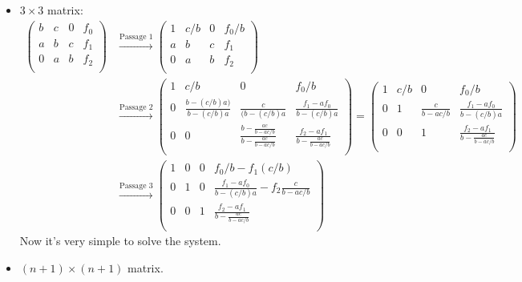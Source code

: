 \documentclass {article}
\begin{document}
\begin{itemize}
	\item $3 \times 3$ matrix:
	\begin{align*}
		\left(
		\begin{array}{ccc|c}
		   b & c &  0 & f_0 \\
		   a & b &  c & f_1 \\
		   0 & a &  b & f_2 \\
		\end{array}	
		\right)
		&\overset{\text{Passage 1}}{\longrightarrow}
		\left(
		\begin{array}{ccc|c}
		   1 & c/b & 0 & f_0/b \\
		   a & b & c & f_1 \\
		   0 & a & b & f_2 \\
		\end{array}
		\right) \\
		&\overset{\text{Passage 2}}{\longrightarrow}
		\left(
		\begin{array}{ccc|c}
		  1 & c/b & 0 & f_0/b \\
		  0 & \frac{b-(c/b)a)}{b-(c/b)a} & \frac{c}{(b-(c/b)a} & \frac{f_1-af_0}{b-(c/b)a} \\
		  0 & 0 & \frac{b-\frac{ac}{b-ac/b}}{b-\frac{ac}{b-ac/b}} & \frac{f_2-af_1}{b-\frac{ac}{b-ac/b}} \\ 
		\end{array}
		\right)
		=
		\left(
		\begin{array}{ccc|c}
		  1 & c/b & 0 & f_0/b \\
		  0 & 1 & \frac{c}{b-ac/b} & \frac{f_1-af_0}{b-(c/b)a} \\
		  0 & 0 & 1 & \frac{f_2-af_1}{b-\frac{ac}{b-ac/b}} \\ 
		\end{array}
		\right) \\
		&\overset{\text{Passage 3}}{\longrightarrow}
		\left(
		\begin{array}{ccc|c}
		  1 & 0 & 0 & f_0/b-f_1(c/b) \\
		  0 & 1 & 0 & \frac{f_1-af_0}{b-(c/b)a}-f_2\frac{c}{b-ac/b} \\
		  0 & 0 & 1 & \frac{f_2-af_1}{b-\frac{ac}{b-ac/b}} \\
		\end{array}
		\right)
	\end{align*}
	Now it's very simple to solve the system.

\item $(n+1) \times (n+1)$ matrix.


\end{itemize}
\end{document}
